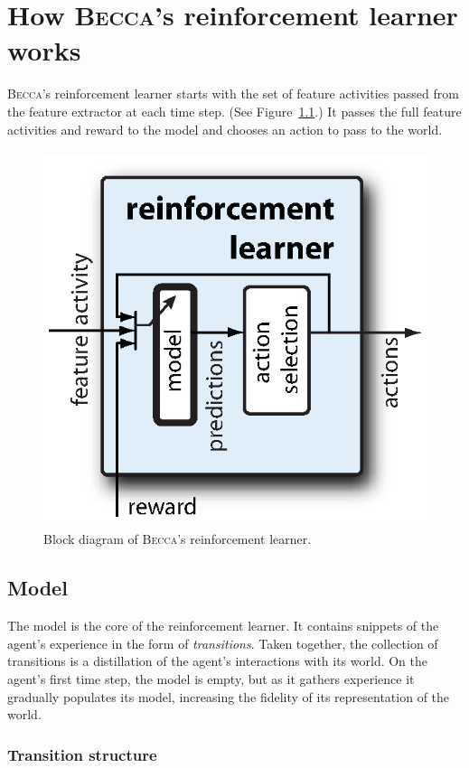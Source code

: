 \chapter{How \textsc{Becca}'s reinforcement learner works}
\label{actor_chapter}

\textsc{Becca}'s reinforcement learner starts with the set of feature activities passed from the feature extractor at each time step. (See Figure~\ref{becca_reinforcement_learner}.) It passes the full feature activities and reward to the model and chooses an action to pass to the world.

\begin{figure}
\centering
\includegraphics[height=11cm]{figs/becca_reinforcement_learner.eps}
\caption{Block diagram of \textsc{Becca}'s reinforcement learner.}
\label{becca_reinforcement_learner}
\end{figure}

\section{Model}
The model is the core of the reinforcement learner. It contains snippets of the agent's experience in the form of {\em transitions}. Taken together, the collection of transitions is a distillation of the agent's interactions with its world. On the agent's first time step, the model is empty, but as it gathers experience it gradually populates its model, increasing the fidelity of its representation of the world. 

\subsection{Transition structure}

